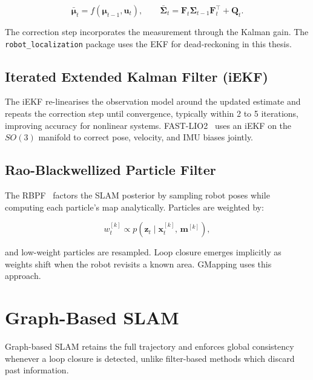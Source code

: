 \begin{equation}
  \bar{\boldsymbol{\mu}}_t = f(\boldsymbol{\mu}_{t-1}, \mathbf{u}_t), \qquad
  \bar{\boldsymbol{\Sigma}}_t = \mathbf{F}_t \boldsymbol{\Sigma}_{t-1} \mathbf{F}_t^\top + \mathbf{Q}_t.
  \label{eq:ekf_predict}
\end{equation}

\noindent The correction step incorporates the measurement through the Kalman
gain. The \texttt{robot\_localization} package uses the EKF for dead-reckoning
in this thesis.

\subsection{Iterated Extended Kalman Filter (iEKF)}

The iEKF re-linearises the observation model around the updated estimate and
repeats the correction step until convergence, typically within 2 to 5
iterations, improving accuracy for nonlinear systems.
FAST-LIO2~\cite{xu2022fastlio2} uses an iEKF on the $SO(3)$ manifold to correct
pose, velocity, and IMU biases jointly.

\subsection{Rao-Blackwellized Particle Filter}

The RBPF~\cite{thrun2005probabilistic} factors the SLAM posterior by sampling
robot poses while computing each particle's map analytically.
Particles are weighted by:

\begin{equation}
  w_t^{[k]} \propto p\!\left(\mathbf{z}_t \mid \mathbf{x}_t^{[k]},\, \mathbf{m}^{[k]}\right),
  \label{eq:rbpf_weight}
\end{equation}

\noindent and low-weight particles are resampled. Loop closure emerges implicitly
as weights shift when the robot revisits a known area. GMapping uses this approach.

\section{Graph-Based SLAM}
\label{sec:graph_slam}

Graph-based SLAM retains the full trajectory and enforces global consistency
whenever a loop closure is detected, unlike filter-based methods which discard
past information.

